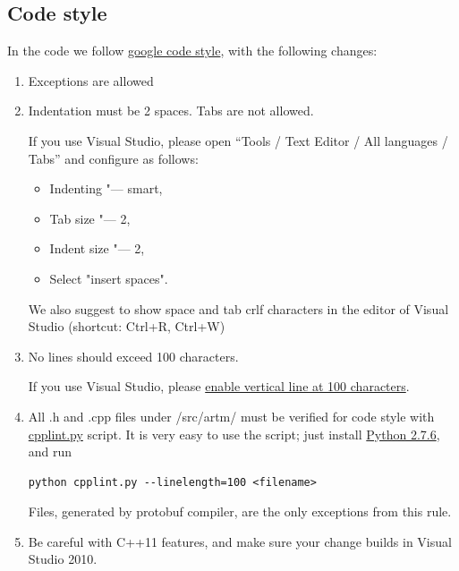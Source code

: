 \documentclass[11pt,a4paper,twoside]{report}
\begin{document}
\subsection{Code style}
\label{label:code_style}
In the code we follow
\href{http://google-styleguide.googlecode.com/svn/trunk/cppguide.xml}{google code style},
with the following changes:
\begin{enumerate}
    \item Exceptions are allowed
    \item Indentation must be 2 spaces. Tabs are not allowed.

      If you use Visual Studio,
      please open ``Tools / Text Editor / All languages / Tabs''
      and configure as follows:
      \begin{itemize}
          \item Indenting "--- smart,
          \item Tab size "--- 2,
          \item Indent size "--- 2,
          \item Select "insert spaces".
      \end{itemize}

      We also suggest to show space and tab crlf characters
      in the editor of Visual Studio (shortcut: Ctrl+R, Ctrl+W)

\item No lines should exceed 100 characters.

      If you use Visual Studio, please \href{http://stackoverflow.com/questions/9894397/100-characters-line-marker-in-visual-studio}{enable
       vertical line at 100 characters}.

\item All .h and .cpp files under /src/artm/ must be verified for code style with
      \href{http://google-styleguide.googlecode.com/svn/trunk/cpplint/cpplint.py}{cpplint.py} script.
      It is very easy to use the script; just install
      \href{http://www.python.org/downloads/}{Python 2.7.6}, and run

\begin{verbatim}
python cpplint.py --linelength=100 <filename>
\end{verbatim}
      Files, generated by protobuf compiler, are the only exceptions from this rule.

\item Be careful with C++11 features, and make sure your change builds in Visual Studio 2010.

\end{enumerate}
\end{document}
